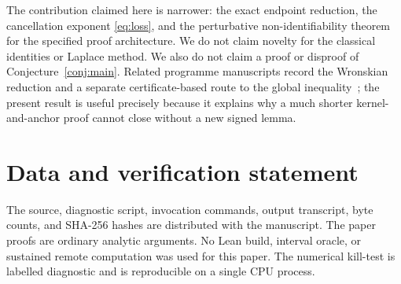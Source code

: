 \documentclass[11pt]{article}
\theoremstyle{definition}
\theoremstyle{remark}
\begin{document}
The contribution claimed here is narrower: the exact endpoint reduction,
the cancellation exponent \eqref{eq:loss}, and the perturbative
non-identifiability theorem for the specified proof architecture.  We do
not claim novelty for the classical identities or Laplace method.  We also
do not claim a proof or disproof of Conjecture~\ref{conj:main}.  Related
programme manuscripts record the Wronskian reduction and a separate
certificate-based route to the global inequality~\cite{WRnote,Surface};
the present result is useful precisely because it explains why a much
shorter kernel-and-anchor proof cannot close without a new signed lemma.

\section*{Data and verification statement}

The source, diagnostic script, invocation commands, output transcript,
byte counts, and SHA-256 hashes are distributed with the manuscript.  The
paper proofs are ordinary analytic arguments.  No Lean build, interval
oracle, or sustained remote computation was used for this paper.  The
numerical kill-test is labelled diagnostic and is reproducible on a single
CPU process.
\end{document}
